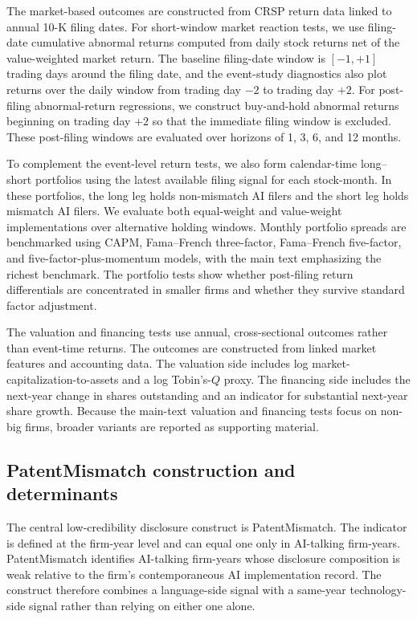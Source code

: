 The market-based outcomes are constructed from CRSP return data linked to annual 10-K filing dates. For short-window market reaction tests, we use filing-date cumulative abnormal returns computed from daily stock returns net of the value-weighted market return. The baseline filing-date window is $[-1,+1]$ trading days around the filing date, and the event-study diagnostics also plot returns over the daily window from trading day $-2$ to trading day $+2$. For post-filing abnormal-return regressions, we construct buy-and-hold abnormal returns beginning on trading day $+2$ so that the immediate filing window is excluded. These post-filing windows are evaluated over horizons of 1, 3, 6, and 12 months.

To complement the event-level return tests, we also form calendar-time long--short portfolios using the latest available filing signal for each stock-month. In these portfolios, the long leg holds non-mismatch AI filers and the short leg holds mismatch AI filers. We evaluate both equal-weight and value-weight implementations over alternative holding windows. Monthly portfolio spreads are benchmarked using CAPM, Fama--French three-factor, Fama--French five-factor, and five-factor-plus-momentum models, with the main text emphasizing the richest benchmark. The portfolio tests show whether post-filing return differentials are concentrated in smaller firms and whether they survive standard factor adjustment.

The valuation and financing tests use annual, cross-sectional outcomes rather than event-time returns. The outcomes are constructed from linked market features and accounting data. The valuation side includes log market-capitalization-to-assets and a log Tobin's-$Q$ proxy. The financing side includes the next-year change in shares outstanding and an indicator for substantial next-year share growth. Because the main-text valuation and financing tests focus on non-big firms, broader variants are reported as supporting material.

\subsection{PatentMismatch construction and determinants}

The central low-credibility disclosure construct is PatentMismatch. The indicator is defined at the firm-year level and can equal one only in AI-talking firm-years. PatentMismatch identifies AI-talking firm-years whose disclosure composition is weak relative to the firm's contemporaneous AI implementation record. The construct therefore combines a language-side signal with a same-year technology-side signal rather than relying on either one alone.

